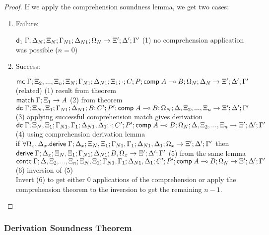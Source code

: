 \begin{proof}
   If we apply the comprehension soundness lemma, we get two cases:
   
   \begin{enumerate}
      \item Failure:
      
      $\mathsf{d}_1 \; \Gamma; \Delta_N; \Xi_N; \Gamma_{N1}; \Delta_{N1}; \Omega_N \rightarrow \Xi'; \Delta'; \Gamma'$ \hfill (1) no comprehension application was possible ($n = 0$)\\
      
      \item Success:
      
      $\mathsf{mc} \; \Gamma; \Xi_2, ..., \Xi_n; \Xi_N; \Gamma_{N1}; \Delta_{N1}; \Xi_1; \cdot; C; P; \mathsf{comp} \; A \multimap B; \Omega_N; \Delta_N \rightarrow \Xi'; \Delta'; \Gamma'$ (related) \hfill (1) result from theorem \\
      $\mathsf{match} \; \Gamma; \Xi_1 \rightarrow A$ \hfill (2) from theorem \\
      $\mathsf{dc} \; \Gamma; \Xi_N, \Xi_1; \Gamma_{N1}; \Delta_{N1}; B; C'; P'; \mathsf{comp} \; A \multimap B; \Omega_N; \Delta, \Xi_2, ..., \Xi_n \rightarrow \Xi'; \Delta'; \Gamma'$ \hfill (3) applying successful comprehension match gives derivation \\
      $\mathsf{dc} \; \Gamma; \Xi_N, \Xi_1; \Gamma_{N1}, \Gamma_1; \Delta_{N1}, \Delta_1; \cdot; C'; P'; \mathsf{comp} \; A \multimap B; \Omega_N; \Delta, \Xi_2, ..., \Xi_n \rightarrow \Xi'; \Delta'; \Gamma'$ \hfill (4) using comprehension derivation lemma \\
      if $\forall \Omega_x, \Delta_x. \mathsf{derive} \; \Gamma; \Delta_x; \Xi_N, \Xi_1; \Gamma_{N1}, \Gamma_1; \Delta_{N1}, \Delta_1; \Omega_x \rightarrow \Xi'; \Delta'; \Gamma'$ then $\mathsf{derive} \; \Gamma; \Delta_x; \Xi_N, \Xi_1; \Gamma_{N1}; \Delta_{N1}; B, \Omega_x \rightarrow \Xi'; \Delta'; \Gamma'$ \hfill (5) from the same lemma \\
      $\mathsf{contc} \; \Gamma; \Delta, \Xi_2, ..., \Xi_n; \Xi_N, \Xi_1; \Gamma_{N1}, \Gamma_1; \Delta_{N1}, \Delta_1; C'; P'; \mathsf{comp} \; A \multimap B; \Omega_N \rightarrow \Xi'; \Delta'; \Gamma'$ \hfill (6) inversion of (5) \\
      
      Invert (6) to get either $0$ applications of the comprehension or apply the comprehension theorem to the inversion to get the remaining $n-1$. 
   \end{enumerate}
\end{proof}

\subsubsection{Derivation Soundness Theorem}

